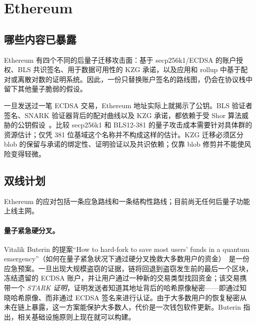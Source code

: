 \section{Ethereum}
\subsection{哪些内容已暴露}
Ethereum 有四个不同的后量子迁移攻击面：基于 secp256k1/ECDSA 的账户授权、BLS 共识签名、用于数据可用性的 KZG 承诺，以及应用和 rollup 中基于配对或离散对数的证明系统。因此，一份只替换账户签名的路线图，仍会在协议栈中留下其他量子脆弱的假设。

一旦发送过一笔 ECDSA 交易，Ethereum 地址实际上就揭示了公钥。BLS 验证者签名、SNARK 验证器背后的配对曲线以及 KZG 承诺，都依赖于受 Shor 算法威胁的公钥假设~\cite{ethpqroadmap,quantumhorizon2026}。比较 secp256k1 和 BLS12-381 的量子攻击成本需要针对具体群的资源估计；仅凭 381 位基域这个名称并不构成这样的估计。KZG 迁移必须区分 blob 的保留与承诺的绑定性、证明验证以及共识依赖；仅靠 blob 修剪并不能使风险变得轻微。

\subsection{双线计划}
\label{sec:eth-two-front}
Ethereum 的应对包括一条应急路线和一条结构性路线；目前尚无任何后量子功能上线主网。

\paragraph{量子紧急硬分叉。}
Vitalik Buterin 的提案“How to hard-fork to save most users' funds in a quantum emergency”（如何在量子紧急状况下通过硬分叉挽救大多数用户的资金）~\cite{buterinquantum2024}是一份应急预案。一旦出现大规模盗窃的证据，链将回退到盗窃发生前的最后一个区块，冻结遗留的 ECDSA 账户，并让用户通过一种新的交易类型找回资金；该交易携带一个 \emph{STARK 证明}，证明发送者知道其地址背后的哈希原像秘密——即通过知晓哈希原像、而非通过 ECDSA 签名来进行认证。由于大多数用户的恢复秘密从未在链上暴露，这一方案能保护大多数人，代价是一次钱包软件更新。Buterin 指出，相关基础设施原则上现在就可以构建。

